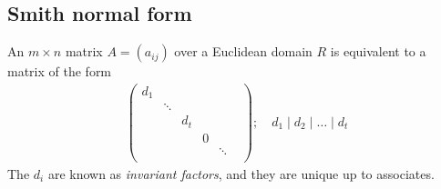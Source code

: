 \subsection{Smith normal form}
\begin{theorem}
	An $m \times n$ matrix $A = (a_{ij})$ over a Euclidean domain $R$ is equivalent to a matrix of the form
	\begin{align*}
		\begin{pmatrix}
			d_1                            \\
			 & \ddots                      \\
			 &        & d_t                \\
			 &        &     & 0            \\
			 &        &     &   & \ddots   \\
			 &        &     &   &        &
		\end{pmatrix};\quad d_1 \mid d_2 \mid \dots \mid d_t
	\end{align*}
	The $d_i$ are known as \textit{invariant factors}, and they are unique up to associates.
\end{theorem}
